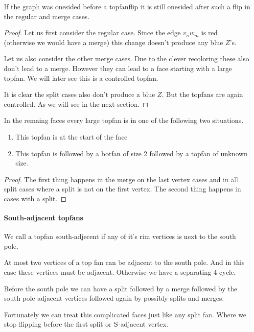 \begin{lemma}
  \label{lm:topfan:oneSidedREL}
  If the graph was onesided before a topfanflip it is still onesided after such a flip in the regular and merge cases.
\end{lemma}
\begin{proof}
  Let us first consider the regular case. Since the edge  $v_n w_m$ is red (otherwise we would have a merge) this change doesn't produce any blue $Z$'s.

  Let us also consider the other merge cases. Due to the   clever recoloring these also don't lead to a merge. However they can lead to a face starting with a large topfan. We will later see this is a controlled topfan.

  It is clear the split cases also don't produce a blue $Z$. But the topfans are again controlled. As we will see in the next section.
\end{proof}


\begin{lemma}
  \label{lm:topfan:remainingTopfans}
  In the remaing faces every large topfan is in one of the following two situations.
  \begin{enumerate}
    \item  This topfan is at the start of the face
    \item  This topfan is followed by a botfan of size 2 followed by a topfan of unknown size.
  \end{enumerate}
\end{lemma}
\begin{proof}
  The first thing happens in the merge on the last vertex cases and in all split cases where a split is not on the first vertex. The second thing happens in cases with a split.
\end{proof}

\paragraph{South-adjacent topfans}
We call a topfan south-adjecent if any of it's rim vertices is next to the south pole.

At most two vertices of a top fan can be adjacent to the south pole. And in this case these vertices must be adjacent. Otherwise we have a separating 4-cycle.

Before the south pole we can have a split followed by a merge followed by the south pole adjacent vertices followed again by possibly splits and merges.

Fortunately we can treat this complicated faces just like any split fan. Where we stop flipping before the first split or $\mathrm{S}$-adjacent vertex.
